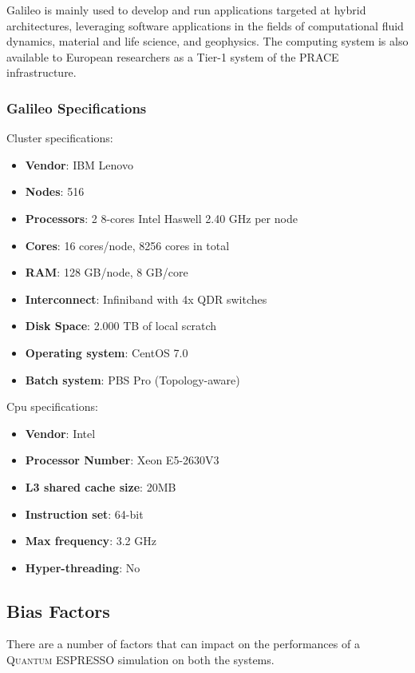 \documentclass[a4paper,12pt]{article}
\newcommand\QE{\textsc{Quantum} ESPRESSO }
\begin{document}
Galileo is mainly used to develop and run applications targeted at hybrid architectures, leveraging software applications in the fields of computational fluid dynamics, material and life science, and geophysics. The computing system is also available to European researchers as a Tier-1 system of the PRACE infrastructure.


\subsubsection{Galileo Specifications}

Cluster specifications: 
\begin{itemize}
\item \textbf{Vendor}: IBM Lenovo
\item \textbf{Nodes}: 516 
\item \textbf{Processors}: 2 8-cores Intel Haswell 2.40 GHz per node
\item \textbf{Cores}: 16 cores/node, 8256 cores in total
\item \textbf{RAM}: 128 GB/node, 8 GB/core
\item \textbf{Interconnect}: Infiniband with 4x QDR switches
\item \textbf{Disk Space}: 2.000 TB of local scratch
\item \textbf{Operating system}: CentOS 7.0
\item \textbf{Batch system}: PBS Pro (Topology-aware)
\end{itemize}

Cpu specifications:
\begin{itemize}
\item \textbf{Vendor}: Intel
\item \textbf{Processor Number}: Xeon E5-2630V3
\item \textbf{L3 shared cache size}: 20MB
\item \textbf{Instruction set}: 64-bit
\item \textbf{Max frequency}: 3.2 GHz
\item \textbf{Hyper-threading}: No 
\end{itemize}



\subsection{Bias Factors}

There are a number of factors that can impact on the performances of a \QE simulation on both the systems.
\end{document}
